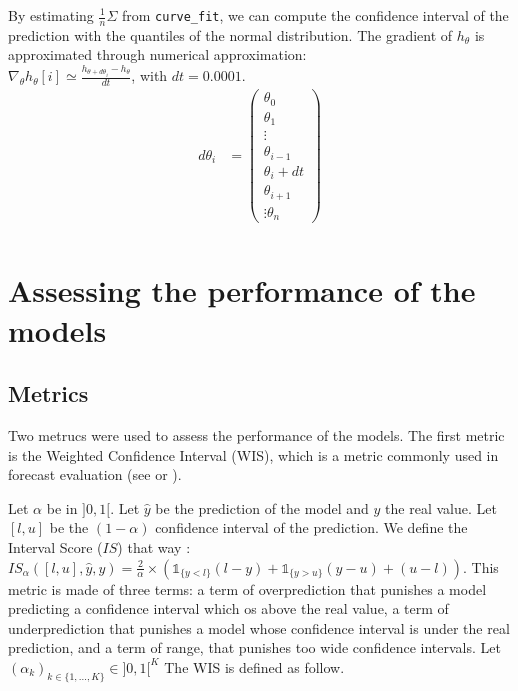 By estimating $\frac{1}{n} \Sigma$ from \texttt{curve\_fit}, we can compute the confidence interval of the prediction with the quantiles of the normal distribution.
The gradient of $h_\theta$ is approximated through numerical approximation: \\
$\nabla_\theta h_\theta [i] \simeq \frac{h_{\theta + d \theta _ i  } - h_\theta}{dt}$, with $dt=0.0001$. \\

\begin{align*}
    d\theta_i &= \begin{pmatrix}
    \theta_0 \\
    \theta_1\\
    \vdots \\
    \theta_{i-1}\\
    \theta_i + dt \\
    \theta_{i+1}\\
    \vdots
    \theta_n 
    \end{pmatrix} \\    
\end{align*}


\section*{Assessing the performance of the models}

\subsection*{Metrics}

Two metrucs were used to assess the performance of the models. 
The first metric is the Weighted Confidence Interval (WIS), which is a metric commonly used in forecast evaluation (see \cite[text]{cramer2022evaluation} or \cite*{paireau2022ensemble}). 

Let $\alpha$ be in $]0, 1[$. Let $\hat{y}$ be the prediction of the model and $y$ the real value.
Let $[l, u]$ be the $(1-\alpha)$ confidence interval of the prediction.
We define the Interval Score ($IS$) that way : \\
$IS_\alpha( [l, u], \hat{y}, y ) = \frac{2}{\alpha} \times ( \mathbb{1}_{\{y<l\}} (l-y) + \mathbb{1}_{\{y>u\}} (y-u) + (u-l))$. 
This metric is made of three terms: a term of overprediction that punishes a model predicting a confidence interval which os above the real value, a term of underprediction that punishes a model whose confidence interval is under the real prediction, and a term of range, that punishes too wide confidence intervals. 
Let $(\alpha_k)_{k \in \{1, \dots , K\}} \in ] 0 , 1 [ ^K $
The WIS is defined as follow. \\

